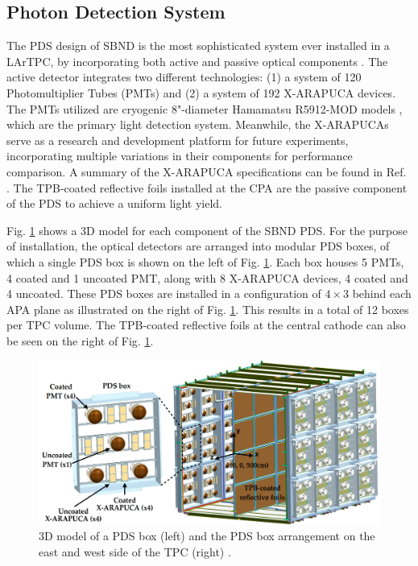 \subsection{Photon Detection System}
\label{sec:sbnd_pds}

The PDS design of SBND is the most sophisticated system ever installed in a LArTPC, by incorporating both active and passive optical components \cite{sbnd_pds_paper}. 
The active detector integrates two different technologies: (1) a system of 120 Photomultiplier Tubes (PMTs) and (2) a system of 192 X-ARAPUCA devices.
The PMTs utilized are cryogenic 8"-diameter Hamamatsu R5912-MOD models \cite{hamamatsu}, which are the primary light detection system. 
Meanwhile, the X-ARAPUCAs serve as a research and development platform for future experiments, incorporating multiple variations in their components for performance comparison. 
A summary of the X-ARAPUCA specifications can be found in Ref. \cite{sbnd_pds_paper}.
The TPB-coated reflective foils installed at the CPA are the passive component of the PDS to achieve a uniform light yield.

Fig. \ref{fig:SBND_PDS} shows a 3D model for each component of the SBND PDS.
For the purpose of installation, the optical detectors are arranged into modular PDS boxes, of which a single PDS box is shown on the left of Fig. \ref{fig:SBND_PDS}.
Each box houses 5 PMTs, 4 coated and 1 uncoated PMT, along with 8 X-ARAPUCA devices, 4 coated and 4 uncoated.
These PDS boxes are installed in a configuration of $4 \times 3$ behind each APA plane as illustrated on the right of Fig. \ref{fig:SBND_PDS}.
This results in a total of 12 boxes per TPC volume.
The TPB-coated reflective foils at the central cathode can also be seen on the right of Fig. \ref{fig:SBND_PDS}.

\begin{figure}[hbp]
\centering    
\includegraphics[width=1.0\textwidth]{SBND_PDS}
\caption[Photon Detection System 3D Model]{
3D model of a PDS box (left) and the PDS box arrangement on the east and west side of the TPC (right) \cite{sbnd_pds_paper}.
}
\label{fig:SBND_PDS}
\end{figure}


